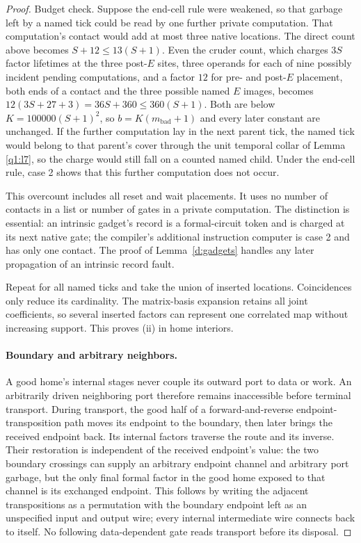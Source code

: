 \begin{proof}
Budget check. Suppose the end-cell rule were weakened, so that garbage left by a named tick could be read by one further private computation. That computation's contact would add at most three native locations. The direct count above becomes \(S+12 \le  13(S+1)\). Even the cruder count, which charges \(3S\) factor lifetimes at the three post-\(E\) sites, three operands for each of nine possibly incident pending computations, and a factor \(12\) for pre- and post-\(E\) placement, both ends of a contact and the three possible named \(E\) images, becomes \(12(3S+27+3) = 36S+360 \le  360(S+1)\). Both are below \(K = 100000(S+1)^{2}\), so \(b = K(m_{\mathrm{bad}}+1)\) and every later constant are unchanged. If the further computation lay in the next parent tick, the named tick would belong to that parent's cover through the unit temporal collar of Lemma \ref{q1:l7}, so the charge would still fall on a counted named child. Under the end-cell rule, case 2 shows that this further computation does not occur.

This overcount includes all reset and wait placements. It uses no number of contacts in a list or number of gates in a private computation. The distinction is essential: an intrinsic gadget's record is a formal-circuit token and is charged at its next native gate; the compiler's additional instruction computer is case 2 and has only one contact. The proof of Lemma~\ref{d:gadgets} handles any later propagation of an intrinsic record fault.

Repeat for all named ticks and take the union of inserted locations. Coincidences only reduce its cardinality. The matrix-basis expansion retains all joint coefficients, so several inserted factors can represent one correlated map without increasing support. This proves (ii) in home interiors.

\paragraph{Boundary and arbitrary neighbors.}

A good home's internal stages never couple its outward port to data or work. An arbitrarily driven neighboring port therefore remains inaccessible before terminal transport. During transport, the good half of a forward-and-reverse endpoint-transposition path moves its endpoint to the boundary, then later brings the received endpoint back. Its internal factors traverse the route and its inverse. Their restoration is independent of the received endpoint's value: the two boundary crossings can supply an arbitrary endpoint channel and arbitrary port garbage, but the only final formal factor in the good home exposed to that channel is its exchanged endpoint. This follows by writing the adjacent transpositions as a permutation with the boundary endpoint left as an unspecified input and output wire; every internal intermediate wire connects back to itself. No following data-dependent gate reads transport before its disposal.


\end{proof}
